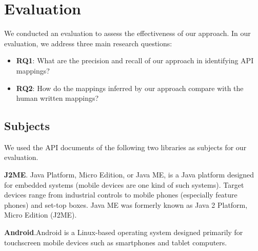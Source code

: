 \section{Evaluation}
\label{sec:evaluation}

We conducted an evaluation to assess the effectiveness of our approach. In our evaluation, we address three main research questions:

\begin{itemize}
	
\item\textbf{RQ1}: What are the precision and recall of our approach in identifying API mappings?

\item\textbf{RQ2}: How do the mappings inferred by our approach compare with the human written mappings?

\end{itemize}

\subsection{Subjects}
\label{sub:subject}

We used the API documents of the following two libraries as subjects for our evaluation. 


\textbf{J2ME}. Java Platform, Micro Edition, or Java ME, is a Java platform designed for embedded systems (mobile devices are one kind of such systems). Target devices range from industrial controls to mobile phones (especially feature phones) and set-top boxes. Java ME was formerly known as Java 2 Platform, Micro Edition (J2ME).

\textbf{Android}.Android is a Linux-based operating system designed primarily for touchscreen mobile devices such as smartphones and tablet computers.

